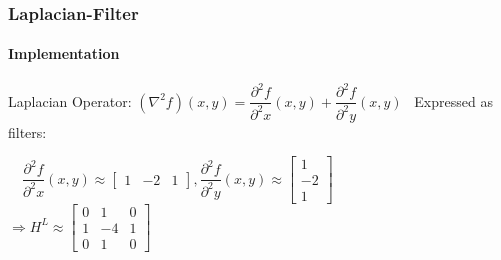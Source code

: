 \begin{frame}
	\frametitle{Laplacian-Filter}
	\framesubtitle{Implementation}

		Laplacian Operator: $(\nabla^2f)(x,y) = \dfrac{\partial^2f}{\partial^2x}(x,y) +\dfrac{\partial^2f}{\partial^2y}(x,y)$
		~\newline Expressed as filters: 
	\begin{center}
		~\newline ~\newline $\dfrac{\partial^2f}{\partial^2x}(x,y) \approx \begin{bmatrix} 1 & -2 & 1 \end{bmatrix}, \dfrac{\partial^2f}{\partial^2y}(x,y) \approx \begin{bmatrix} 1 \\ -2 \\ 1 \end{bmatrix}$ 
		~\newline ~\newline ~\newline ~\newline
		$\Rightarrow H^L \approx \begin{bmatrix} 0 & 1 & 0 \\ 1 & -4 & 1 \\ 0 & 1 & 0 \end{bmatrix}$
	\end{center}
\end{frame}
